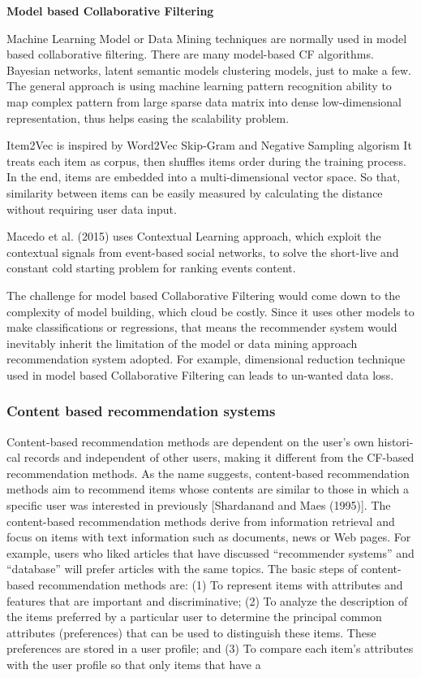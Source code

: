 \bigskip
\textbf{Model based Collaborative Filtering}

Machine Learning Model or Data Mining techniques are normally used in model based collaborative filtering. There are many model-based CF algorithms. Bayesian networks, latent semantic models clustering models, just to make a few. The general approach is using machine learning pattern recognition ability to map complex pattern from large sparse data matrix into dense low-dimensional representation, thus helps easing the scalability problem.  

Item2Vec \citep{barkan2016item2vec} is inspired by Word2Vec \citep{mikolov2013distributed} Skip-Gram and Negative Sampling algorism It treats each item as corpus, then shuffles items order during the training process. In the end, items are embedded into a multi-dimensional vector space. So that, similarity between items can be easily measured by calculating the distance without requiring user data input.  

Macedo et al. (2015) uses Contextual Learning approach, which exploit the contextual signals from event-based social networks, to solve the short-live and constant cold starting problem for ranking events content. 

The challenge for model based Collaborative Filtering would come down to the complexity of model building, which cloud be costly.  Since it uses other models to make classifications or regressions, that means the recommender system would inevitably inherit the limitation of the model or data mining approach recommendation system adopted. For example, dimensional reduction technique used in model based Collaborative Filtering can leads to un-wanted data loss. 
 


\bigskip
\subsubsection{Content based recommendation systems}

Content-based recommendation methods are dependent on the user’s own histori- cal records and independent of other users, making it different from the CF-based recommendation methods. As the name suggests, content-based recommendation methods aim to recommend items whose contents are similar to those in which a specific user was interested in previously [Shardanand and Maes (1995)]. The content-based recommendation methods derive from information retrieval and focus on items with text information such as documents, news or Web pages. For example, users who liked articles that have discussed “recommender systems” and “database” will prefer articles with the same topics. The basic steps of content-based recommendation methods are: (1) To
represent items with attributes and features that are important and discriminative; (2) To analyze the description of the items preferred by a particular user to determine the principal common attributes (preferences) that can be used to distinguish these items. These preferences are stored in a user profile; and (3) To compare each item’s attributes with the user profile so that only items that have a

